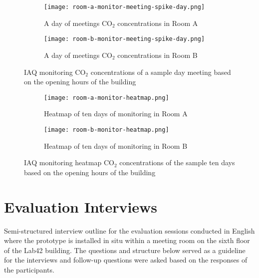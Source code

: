 \begin{appendices}
\begin{figure}[htbp]
    \centering
    \begin{subfigure}{0.46\textwidth}
        \centering
        \texttt{[image: room-a-monitor-meeting-spike-day.png]}
        \caption{A day of meetings CO$_{2}$ concentrations in Room A}
        \label{fig:monitor-multiple-a}
    \end{subfigure}
    \hfill
    \begin{subfigure}{0.46\textwidth}
        \centering
        \texttt{[image: room-b-monitor-meeting-spike-day.png]}
        \caption{A day of meetings CO$_{2}$ concentrations in Room B}
        \label{fig:monitor-multiple-b}
    \end{subfigure}
    \caption{IAQ monitoring CO$_{2}$ concentrations of a sample day meeting based on the opening hours of the building}
    \label{fig:monitoring-multiple}
\end{figure}

\begin{figure}[htbp]
    \centering
    \begin{subfigure}{0.46\textwidth}
        \centering
        \texttt{[image: room-a-monitor-heatmap.png]}
        \caption{Heatmap of ten days of monitoring in Room A}
        \label{fig:monitor-heatmap-a}
    \end{subfigure}
    \hfill
    \begin{subfigure}{0.46\textwidth}
        \centering
        \texttt{[image: room-b-monitor-heatmap.png]}
        \caption{Heatmap of ten days of monitoring in Room B}
        \label{fig:monitor-heatmap-b}
    \end{subfigure}
    \caption{IAQ monitoring heatmap CO$_{2}$ concentrations of the sample ten days based on the opening hours of the building}
    \label{fig:monitoring-heatmap}
\end{figure}

\newpage

\section{Evaluation Interviews}
\label{appendix:evaluation}

Semi-structured interview outline for the evaluation sessions conducted in English where the prototype is installed in situ within a meeting room on the sixth floor of the Lab42 building. The questions and structure below served as a guideline for the interviews and follow-up questions were asked based on the responses of the participants.


\end{appendices}
